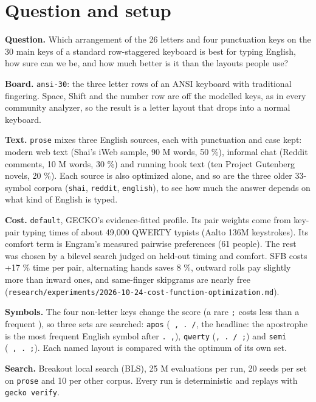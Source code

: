 \documentclass{gecko-paper}
\begin{document}
{\small
\section{Question and setup}

\textbf{Question.} Which arrangement of the 26 letters and four punctuation keys on the 30 main keys of a standard row-staggered keyboard is best for typing English, how sure can we be, and how much better is it than the layouts people use?

\textbf{Board.} \texttt{ansi-30}: the three letter rows of an ANSI keyboard with traditional fingering. Space, Shift and the number row are off the modelled keys, as in every community analyzer, so the result is a letter layout that drops into a normal keyboard.

\textbf{Text.} \texttt{prose} mixes three English sources, each with punctuation and case kept: modern web text (Shai's iWeb sample, 90 M words, 50 \%), informal chat (Reddit comments, 10 M words, 30 \%) and running book text (ten Project Gutenberg novels, 20 \%). Each source is also optimized alone, and so are the three older 33-symbol corpora (\texttt{shai}, \texttt{reddit}, \texttt{english}),
to see how much the answer depends on what kind of English is typed.

\textbf{Cost.} \texttt{default}, GECKO's evidence-fitted profile. Its pair weights come from key-pair typing times of about 49,000 QWERTY typists (Aalto 136M keystrokes). Its comfort term is Engram's measured pairwise preferences (61 people). The rest was chosen by a bilevel search judged on held-out timing and comfort. SFB costs +17 \% time per pair, alternating hands saves 8 \%, outward rolls
pay slightly more than inward ones, and same-finger skipgrams are nearly free (\texttt{research/experiments/2026-10-24-cost-function-optimization.md}).

\textbf{Symbols.} The four non-letter keys change the score (a rare \texttt{;} costs less than a frequent \texttt{\textquotesingle{}}), so three sets are searched: \texttt{apos} (\texttt{\textquotesingle{}\ ,\ .\ /}, the headline: the apostrophe is the most frequent English symbol after \texttt{.\ ,}), \texttt{qwerty} (\texttt{,\ .\ /\ ;}) and \texttt{semi} (\texttt{\textquotesingle{}\ ,\ .\ ;}).
Each named layout is compared with the optimum of its own set.

\textbf{Search.} Breakout local search (BLS), 25 M evaluations per run, 20 seeds per set on \texttt{prose} and 10 per other corpus. Every run is deterministic and replays with \texttt{gecko\ verify}.

}
\end{document}
